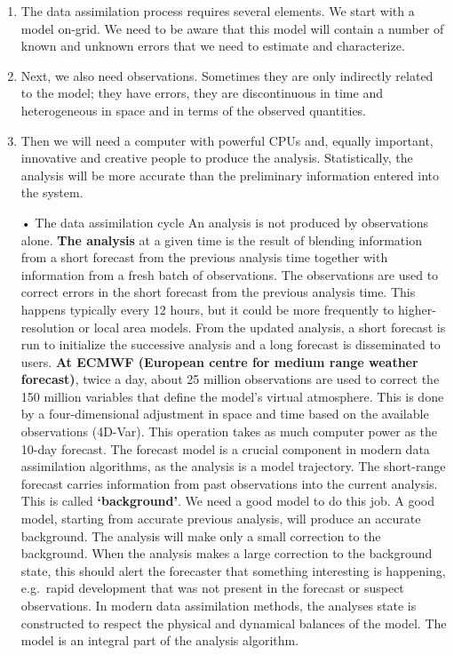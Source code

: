 \documentclass[12pt,oneside]{book}
\begin{document}
\begin{enumerate}
\def\labelenumi{\arabic{enumi}.}
\item
  The data assimilation process requires several elements. We start with
  a model on-grid. We need to be aware that this model will contain a
  number of known and unknown errors that we need to estimate and
  characterize.
\item
  Next, we also need observations. Sometimes they are only indirectly
  related to the model; they have errors, they are discontinuous in time
  and heterogeneous in space and in terms of the observed quantities.
\item
  Then we will need a computer with powerful CPUs and, equally
  important, innovative and creative people to produce the analysis.
  Statistically, the analysis will be more accurate than the preliminary
  information entered into the system.

  • The data assimilation cycle An analysis is not produced by
  observations alone. \textbf{The analysis} at a given time is the
  result of blending information from a short forecast from the previous
  analysis time together with information from a fresh batch of
  observations. The observations are used to correct errors in the short
  forecast from the previous analysis time. This happens typically every
  12 hours, but it could be more frequently to higher-resolution or
  local area models. From the updated analysis, a short forecast is run
  to initialize the successive analysis and a long forecast is
  disseminated to users. \textbf{At ECMWF (European centre for medium
  range weather forecast)}, twice a day, about 25 million observations
  are used to correct the 150 million variables that define the model's
  virtual atmosphere. This is done by a four-dimensional adjustment in
  space and time based on the available observations (4D-Var). This
  operation takes as much computer power as the 10-day forecast. The
  forecast model is a crucial component in modern data assimilation
  algorithms, as the analysis is a model trajectory. The short-range
  forecast carries information from past observations into the current
  analysis. This is called \textbf{`background'}. We need a good model
  to do this job. A good model, starting from accurate previous
  analysis, will produce an accurate background. The analysis will make
  only a small correction to the background. When the analysis makes a
  large correction to the background state, this should alert the
  forecaster that something interesting is happening, e.g.~rapid
  development that was not present in the forecast or suspect
  observations. In modern data assimilation methods, the analyses state
  is constructed to respect the physical and dynamical balances of the
  model. The model is an integral part of the analysis algorithm.


\end{enumerate}
\end{document}
